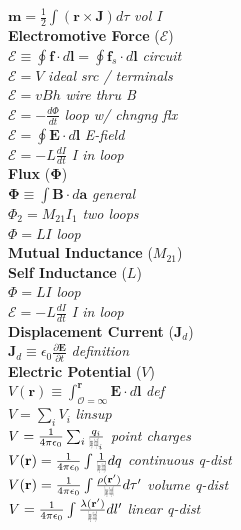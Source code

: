 \documentclass[9pt]{extarticle}
\def\rcurs{{\mbox{$\resizebox{.09in}{.08in}{\texttt{[image: ScriptR]}}$}}}
\begin{document}
\begin{multicols}{3}
$\mathbf{m} = \frac{1}{2}\int(\mathbf{r}\times\mathbf{J})d\tau$ \textit{vol I} \\
\textbf{Electromotive Force} ($\mathcal{E}$) \\
$\mathcal{E} \equiv \oint\mathbf{f}\cdot d\mathbf{l} = \oint\mathbf{f}_{s}\cdot d\mathbf{l}$ \textit{circuit} \\
$\mathcal{E} = V$ \textit{ideal src / terminals} \\
$\mathcal{E} = vBh$ \textit{wire thru B} \\
$\mathcal{E} = -\frac{d\Phi}{dt}$ \textit{loop w/ chngng flx} \\
$\mathcal{E} = \oint\mathbf{E}\cdot d\mathbf{l}$ \textit{E-field} \\
$\mathcal{E} = -L\frac{dI}{dt}$ \textit{I in loop} \\
\textbf{Flux} ($\mathbf{\Phi}$) \\
$\mathbf{\Phi} \equiv \int \mathbf{B}\cdot d\mathbf{a}$ \textit{general} \\
$\Phi_{2} = M_{21}I_{1}$ \textit{two loops} \\
$\Phi = LI$ \textit{loop} \\
\textbf{Mutual Inductance} ($M_{21}$) \\
\textbf{Self Inductance} ($L$) \\
$\Phi = LI$ \textit{loop} \\
$\mathcal{E} = -L\frac{dI}{dt}$ \textit{I in loop} \\
\textbf{Displacement Current} ($\mathbf{J}_{d}$) \\
$\mathbf{J}_{d} \equiv \epsilon_{0}\frac{\partial\mathbf{E}}{\partial t}$ \textit{definition} \\
\textbf{Electric Potential} ($V$) \\
$V(\mathbf{r}) \equiv\int_{\mathcal{O}=\infty}^{\mathbf{r}} \mathbf{E}\cdot d\mathbf{l}$ \textit{def} \\
$V = \sum_{i}V_{i}$ \textit{linsup} \\
$V = \frac{1}{4\pi\epsilon_{0}}\sum_{i}\frac{q_{i}}{\rcurs_{i}}$ \textit{point charges} \\
$V(\mathbf{r}) = \frac{1}{4\pi\epsilon_{0}}\int\frac{1}{\rcurs}dq$ \textit{continuous q-dist} \\
$V(\mathbf{r}) = \frac{1}{4\pi\epsilon_{0}}\int\frac{\rho(\mathbf{r'})}{\rcurs}d\tau'$  \textit{volume q-dist} \\
$V = \frac{1}{4\pi\epsilon_{0}}\int\frac{\lambda(\mathbf{r'})}{\rcurs}dl'$ \textit{linear q-dist} \\

\end{multicols}
\end{document}
